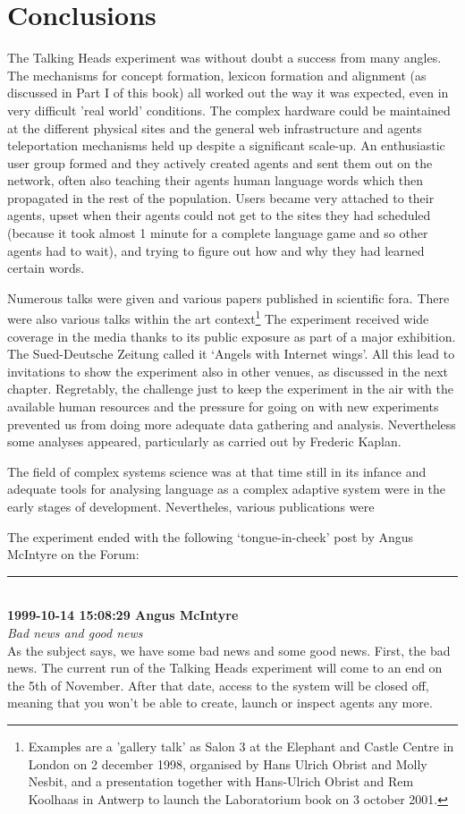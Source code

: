 {\section{Conclusions} 

The Talking Heads experiment was without doubt a success from many angles. The mechanisms for concept formation,
lexicon formation and alignment (as discussed in Part I of this book) all worked out the 
way it was expected, even in very difficult 'real world' conditions. The complex hardware could be maintained at the 
different physical sites and the general web infrastructure and agents teleportation mechanisms held up despite a 
significant scale-up. An enthusiastic user group formed and they actively created agents and sent 
them out on the network, often also teaching their agents human language words which then propagated
in the rest of the population. Users became very attached to their agents, upset when their agents could not get 
to the sites they had scheduled (because it took almost 1 minute for a complete language game and so other agents 
had to wait), and trying to figure out how and why they had learned certain words. 

Numerous talks were given and various papers published in scientific fora. There were also various talks within 
the art context\footnote{Examples are a 'gallery talk' as Salon 3 at the Elephant and Castle Centre
in London on 2 december 1998, organised by Hans Ulrich Obrist and Molly Nesbit, and a presentation together with 
Hans-Ulrich Obrist and Rem Koolhaas in Antwerp to launch the Laboratorium book on 3 october 2001.}
The experiment received wide coverage in 
the media thanks to its public exposure as part of a major exhibition. The Sued-Deutsche Zeitung called it 
`Angels with Internet wings'. All this lead to invitations to show the experiment
also in other venues, as discussed in the next chapter. 
Regretably, the challenge just to keep the experiment in the air with the available human resources
and the pressure for going on with new experiments prevented us from doing more adequate data gathering 
and analysis. Nevertheless some analyses appeared, particularly as carried out by Frederic Kaplan\cite{Kaplan:2001}. 

The field of complex systems science was at that time still in its infance and 
adequate tools for analysing language as a complex adaptive system were in the early stages of development. 
Nevertheles, various publications were 

The experiment ended with the following `tongue-in-cheek' post by Angus McIntyre on the Forum: \\
{\small
\rule{0.8\textwidth}{.4pt}\\
{\bf 1999-10-14 15:08:29 Angus McIntyre}\\
{\it Bad news and good news}\\
\noindent
As the subject says, we have some bad news and some good news.
\noindent
First, the bad news. The current run of the Talking Heads experiment will come to an end on the 5th of November. After that date, access to the system will be closed off, meaning that you won't be able to create, launch or inspect agents any more.

}}
